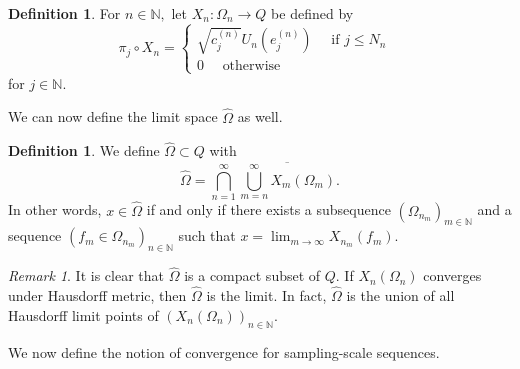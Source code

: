 \documentclass{amsart}
\theoremstyle{definition}
\newtheorem{definition}[thm]{Definition}
\theoremstyle{remark}
\newtheorem{remark}[thm]{Remark}
\def \HOM{\hat{\Omega}}
\begin{document}
\begin{definition}\label{definition_finite_embedding_cube}
	For $n\in\mathbb{N},$ let $X_n:\Omega_n\rightarrow Q$ be defined by $$\pi_j\circ X_n=\begin{cases}
		\sqrt{c_j^{(n)}}U_n(e_j^{(n)})\quad\text{ if $j\leq N_n$ }\\
		0\quad \text{ otherwise }
	\end{cases}$$ for $j\in\mathbb{N}.$%
\end{definition}

We can now define the limit space $\HOM$ as well.

\begin{definition}\label{definition_limit_space}
	We define $\HOM\subset Q$ with $$\HOM=\bigcap_{n=1}^{\infty}\overline{\bigcup_{m=n}^{\infty}X_m(\Omega_m)}.$$ In other words, $x\in\hat{\Omega}$ if and only if there exists a subsequence $(\Omega_{n_m})_{m\in\mathbb{N}}$ and a sequence $(f_m\in\Omega_{n_m})_{n\in\mathbb{N}}$ such that $x=\lim_{m\rightarrow\infty}X_{n_m}(f_m).$
\end{definition}
\begin{remark}
	It is clear that $\HOM$ is a compact subset of $Q$. If $X_n(\Omega_n)$ converges under Hausdorff metric, then $\HOM$ is the limit. In fact, $\HOM$ is the union of all Hausdorff limit points of $(X_n(\Omega_n))_{n\in\mathbb{N}}.$
\end{remark}

We now define the notion of convergence for sampling-scale sequences.
\end{document}
